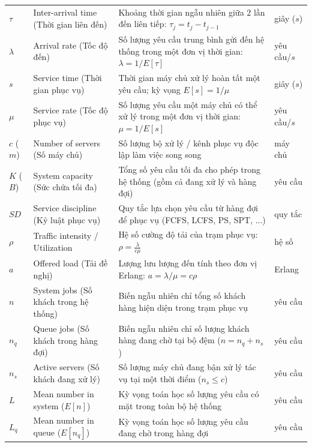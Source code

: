 \begin{xltabular}{\linewidth}{@{} >{\centering\arraybackslash}p{1.6cm} >{\raggedright\arraybackslash}p{6.25cm} >{\raggedright\arraybackslash}X >{\centering\arraybackslash}p{1.6cm} @{}}
$\tau$ & Inter-arrival time (Thời gian liên đến) & Khoảng thời gian ngẫu nhiên giữa 2 lần đến liên tiếp: $\tau_j = t_j - t_{j-1}$ & giây ($s$) \\
$\lambda$ & Arrival rate (Tốc độ đến) & Số lượng yêu cầu trung bình gửi đến hệ thống trong một đơn vị thời gian: $\lambda = 1 / E[\tau]$ & yêu cầu/$s$ \\
$s$ & Service time (Thời gian phục vụ) & Thời gian máy chủ xử lý hoàn tất một yêu cầu; kỳ vọng $E[s] = 1/\mu$ & giây ($s$) \\
$\mu$ & Service rate (Tốc độ phục vụ) & Số lượng yêu cầu một máy chủ có thể xử lý trong một đơn vị thời gian: $\mu = 1 / E[s]$ & yêu cầu/$s$ \\
$c$ ($m$) & Number of servers (Số máy chủ) & Số lượng bộ xử lý / kênh phục vụ độc lập làm việc song song & máy chủ \\
$K$ ($B$) & System capacity (Sức chứa tối đa) & Tổng số yêu cầu tối đa cho phép trong hệ thống (gồm cả đang xử lý và hàng đợi) & yêu cầu \\
$SD$ & Service discipline (Kỷ luật phục vụ) & Quy tắc lựa chọn yêu cầu từ hàng đợi để phục vụ (FCFS, LCFS, PS, SPT, ...) & quy tắc \\
$\rho$ & Traffic intensity / Utilization & Hệ số cường độ tải của trạm phục vụ: $\rho = \frac{\lambda}{c\mu}$ & hệ số \\
$a$ & Offered load (Tải đề nghị) & Lượng lưu lượng đến tính theo đơn vị Erlang: $a = \lambda / \mu = c\rho$ & Erlang \\
$n$ & System jobs (Số khách trong hệ thống) & Biến ngẫu nhiên chỉ tổng số khách hàng hiện diện trong trạm phục vụ & yêu cầu \\
$n_q$ & Queue jobs (Số khách trong hàng đợi) & Biến ngẫu nhiên chỉ số lượng khách hàng đang chờ tại bộ đệm ($n = n_q + n_s$) & yêu cầu \\
$n_s$ & Active servers (Số khách đang xử lý) & Số lượng máy chủ đang bận xử lý tác vụ tại một thời điểm ($n_s \le c$) & yêu cầu \\
$L$ & Mean number in system ($E[n]$) & Kỳ vọng toán học số lượng yêu cầu có mặt trong toàn bộ hệ thống & yêu cầu \\
$L_q$ & Mean number in queue ($E[n_q]$) & Kỳ vọng toán học số lượng yêu cầu đang chờ trong hàng đợi & yêu cầu \\

\end{xltabular}
